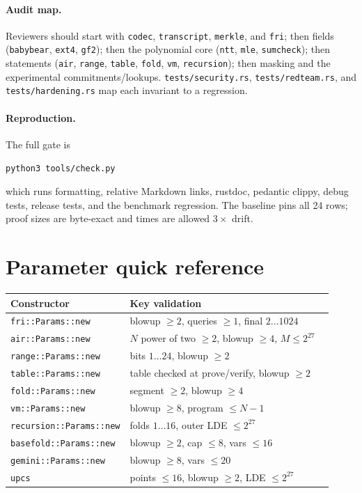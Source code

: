 \documentclass[11pt,a4paper]{article}
\begin{document}
\paragraph{Audit map.} Reviewers should start with \texttt{codec},
\texttt{transcript}, \texttt{merkle}, and \texttt{fri}; then fields
(\texttt{babybear}, \texttt{ext4}, \texttt{gf2}); then the polynomial core
(\texttt{ntt}, \texttt{mle}, \texttt{sumcheck}); then statements
(\texttt{air}, \texttt{range}, \texttt{table}, \texttt{fold},
\texttt{vm}, \texttt{recursion}); then masking and the experimental
commitments/lookups. \texttt{tests/security.rs},
\texttt{tests/redteam.rs}, and \texttt{tests/hardening.rs} map each invariant
to a regression.

\paragraph{Reproduction.} The full gate is
\begin{center}
\texttt{python3 tools/check.py}
\end{center}
which runs formatting, relative Markdown links, rustdoc, pedantic clippy,
debug tests, release tests, and the benchmark regression. The baseline pins
all 24 rows; proof sizes are byte-exact and times are allowed $3\times$
drift.

\appendix

\section{Parameter quick reference}

\begin{longtable}{@{}L{0.28\linewidth}L{0.64\linewidth}@{}}
\toprule
Constructor & Key validation \\
\midrule
\endhead
\texttt{fri::Params::new} & blowup $\ge2$, queries $\ge1$, final $2\dots1024$ \\
\texttt{air::Params::new} & $N$ power of two $\ge2$, blowup $\ge4$, $M\le2^{27}$ \\
\texttt{range::Params::new} & bits $1\dots24$, blowup $\ge2$ \\
\texttt{table::Params::new} & table checked at prove/verify, blowup $\ge2$ \\
\texttt{fold::Params::new} & segment $\ge2$, blowup $\ge4$ \\
\texttt{vm::Params::new} & blowup $\ge8$, program $\le N-1$ \\
\texttt{recursion::Params::new} & folds $1\dots16$, outer LDE $\le2^{27}$ \\
\texttt{basefold::Params::new} & blowup $\ge2$, cap $\le8$, vars $\le16$ \\
\texttt{gemini::Params::new} & blowup $\ge8$, vars $\le20$ \\
\texttt{upcs} & points $\le16$, blowup $\ge2$, LDE $\le2^{27}$ \\
\bottomrule
\end{longtable}
\end{document}
